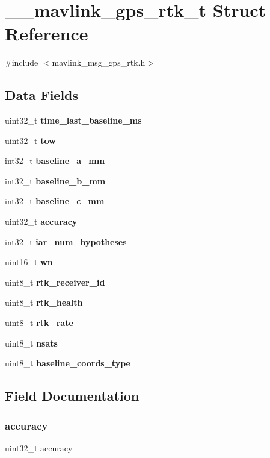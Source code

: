 \section{\+\_\+\+\_\+mavlink\+\_\+gps\+\_\+rtk\+\_\+t Struct Reference}
\label{struct____mavlink__gps__rtk__t}


{\ttfamily \#include $<$mavlink\+\_\+msg\+\_\+gps\+\_\+rtk.\+h$>$}

\subsection*{Data Fields}
\begin{DoxyCompactItemize}
\item 
uint32\+\_\+t \textbf{ time\+\_\+last\+\_\+baseline\+\_\+ms}
\item 
uint32\+\_\+t \textbf{ tow}
\item 
int32\+\_\+t \textbf{ baseline\+\_\+a\+\_\+mm}
\item 
int32\+\_\+t \textbf{ baseline\+\_\+b\+\_\+mm}
\item 
int32\+\_\+t \textbf{ baseline\+\_\+c\+\_\+mm}
\item 
uint32\+\_\+t \textbf{ accuracy}
\item 
int32\+\_\+t \textbf{ iar\+\_\+num\+\_\+hypotheses}
\item 
uint16\+\_\+t \textbf{ wn}
\item 
uint8\+\_\+t \textbf{ rtk\+\_\+receiver\+\_\+id}
\item 
uint8\+\_\+t \textbf{ rtk\+\_\+health}
\item 
uint8\+\_\+t \textbf{ rtk\+\_\+rate}
\item 
uint8\+\_\+t \textbf{ nsats}
\item 
uint8\+\_\+t \textbf{ baseline\+\_\+coords\+\_\+type}
\end{DoxyCompactItemize}


\subsection{Field Documentation}
\mbox{\label{struct____mavlink__gps__rtk__t_a28f507097f56f5f24ed62f9bd1416cc0}} 
\subsubsection{accuracy}
{\footnotesize\ttfamily uint32\+\_\+t accuracy}

